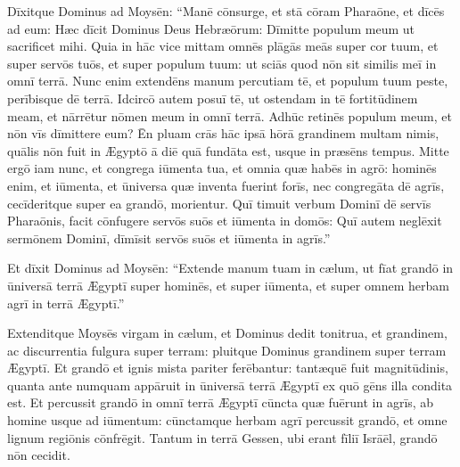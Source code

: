 Dīxitque Dominus ad Moysēn: ``Manē
cōnsurge, et stā cōram Pharaōne, et dīcēs ad eum:
Hæc dīcit Dominus Deus Hebræōrum: Dīmitte populum meum ut sacrificet
mihi.  Quia in hāc vice mittam omnēs 
plāgās meās super
cor tuum, et super servōs tuōs, et super populum tuum: ut sciās quod nōn
sit similis meī in omnī terrā.  Nunc enim extendēns manum percutiam tē,
et populum tuum peste, perībisque dē terrā.  Idcircō autem posuī tē, ut ostendam in tē fortitūdinem
meam, et nārrētur nōmen meum in omnī terrā.  Adhūc retinēs populum meum,
et nōn vīs dīmittere eum?  Ēn pluam crās hāc ipsā hōrā
grandinem multam nimis, quālis nōn fuit in Ægyptō ā diē quā
fundāta est, usque in præsēns tempus.  Mitte ergō iam nunc, et
congrega iūmenta tua, et omnia quæ habēs in agrō: hominēs
enim, et iūmenta, et ūniversa quæ inventa fuerint forīs, nec
congregāta dē
agrīs, cecīderitque super ea grandō, morientur.  Quī
timuit verbum Dominī dē servīs Pharaōnis, facit cōnfugere
servōs suōs et iūmenta in domōs: Quī autem neglēxit sermōnem Dominī,
dīmīsit servōs suōs et iūmenta in agrīs.''

Et dīxit Dominus ad Moysēn: ``Extende manum tuam in cælum, ut fīat grandō in ūniversā terrā Ægyptī super
hominēs, et super iūmenta, et super omnem herbam agrī in terrā Ægyptī.''

Extenditque Moysēs virgam in cælum, et Dominus dedit
tonitrua, et grandinem, ac discurrentia
fulgura super terram: pluitque Dominus grandinem super
terram Ægyptī.  Et grandō et ignis mista
pariter ferēbantur: tantæquē fuit
magnitūdinis, quanta ante numquam appāruit in ūniversā
terrā Ægyptī ex quō gēns illa condita est.  Et percussit
grandō in omnī terrā Ægyptī cūncta quæ fuērunt in agrīs, ab homine usque ad
iūmentum: cūnctamque herbam agrī percussit grandō, et omne lignum regiōnis
cōnfrēgit.  Tantum in terrā Gessen, ubi erant fīliī
Isrāēl, grandō nōn cecidit.  

